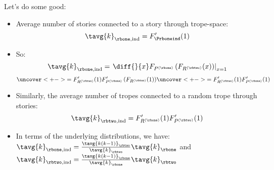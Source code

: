 \begin{frame}
  \begin{block}{Let's do some good:}
    \begin{itemize}
    \item<+->
      Average number of stories connected to a story
      through trope-space:
      $$
      \tavg{k}_{\rbone,\textnormal{ind}}
      =
      F'_{\Prboneind}(1)
      $$
    \item<+->
      So:
      $$
      \tavg{k}_{\rbone,\textnormal{ind}}
      =
      \left.
      \diff{}{x}
      F_{P^{(\rbone)}}
      \left(
        F_{R^{(\rbtwo)}}(x)      
      \right)
      \right|_{x=1}
      $$
      $$
      \uncover<+->{
      =
      F'_{R^{(\rbtwo)}}(1)
      F'_{P^{(\rbone)}}
      \left(
        F_{R^{(\rbtwo)}}(1)      
      \right)
      }
      \uncover<+->{
      =
      F'_{R^{(\rbtwo)}}(1)
      F'_{P^{(\rbone)}}(1)
    }
      $$
    \item<+->
      Similarly, the 
      average number of tropes connected to a random trope
      through stories:
      $$
      \tavg{k}_{\rbtwo,\textnormal{ind}}
      =
      F'_{R^{(\rbone)}}(1)
      F'_{P^{(\rbtwo)}}(1)
      $$
    \item<+->
      In terms of the underlying distributions, we have:
      $
      \tavg{k}_{\rbone,\textnormal{ind}}
      = 
      \frac{\tavg{k(k-1)}_{\rbtwo}}
      {\tavg{k}_{\rbtwo}}
      \tavg{k}_{\rbone}
      $
      and
      $
      \tavg{k}_{\rbtwo,\textnormal{ind}}
      = 
      \frac{\tavg{k(k-1)}_{\rbone}}
      {\tavg{k}_{\rbone}}
      \tavg{k}_{\rbtwo}
      $
    \end{itemize}
  \end{block}
  
\end{frame}

